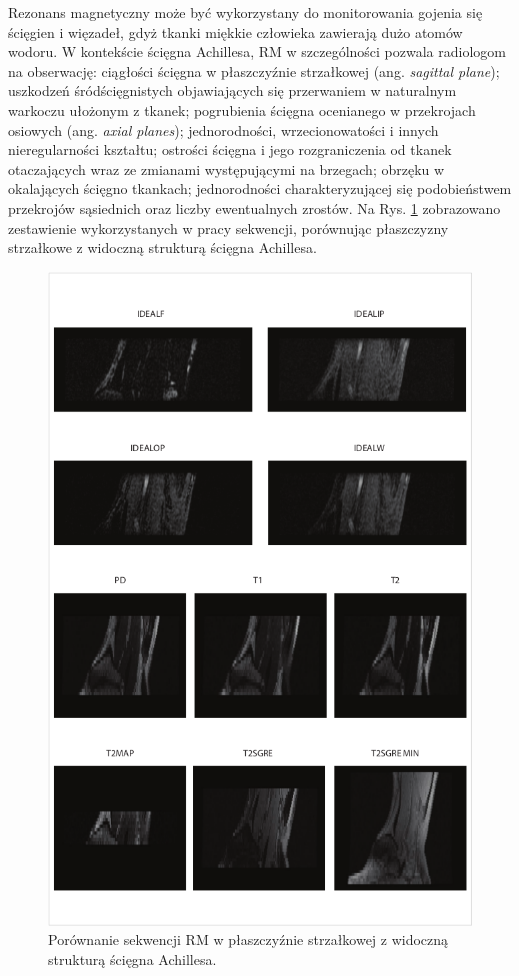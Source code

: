 Rezonans magnetyczny może być wykorzystany do monitorowania gojenia się ścięgien i więzadeł, gdyż tkanki miękkie człowieka zawierają dużo atomów wodoru. W kontekście ścięgna Achillesa, RM w szczególności pozwala radiologom na obserwację: ciągłości ścięgna w płaszczyźnie strzałkowej (ang. \textit{sagittal plane}); uszkodzeń śródścięgnistych objawiających się przerwaniem w naturalnym warkoczu ułożonym \linebreak z tkanek; pogrubienia ścięgna ocenianego w przekrojach osiowych (ang. \textit{axial planes}); jednorodności, wrzecionowatości i innych nieregularności kształtu; ostrości ścięgna i jego rozgraniczenia od tkanek otaczających wraz ze zmianami występującymi \linebreak na brzegach; obrzęku w okalających ścięgno tkankach; jednorodności charakteryzującej się podobieństwem przekrojów sąsiednich oraz liczby ewentualnych zrostów. Na Rys. \ref{sagittalAchillesComp} zobrazowano zestawienie wykorzystanych w pracy sekwencji, porównując płaszczyzny strzałkowe z widoczną strukturą ścięgna Achillesa.  
\begin{figure}[]
	\centering
	\includegraphics[width=1\textwidth]{figures/sciegno.png}
	\caption{Porównanie sekwencji RM w płaszczyźnie strzałkowej z widoczną strukturą ścięgna Achillesa.}
	\label{sagittalAchillesComp}
\end{figure}

